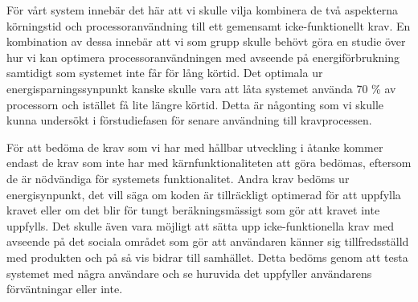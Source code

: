 För vårt system innebär det här att vi skulle vilja kombinera de två aspekterna körningstid och processoranvändning till ett gemensamt icke-funktionellt krav. En kombination av dessa innebär att vi som grupp skulle behövt göra en studie över hur vi kan optimera processoranvändningen med avseende på energiförbrukning samtidigt som systemet inte får för lång körtid. Det optimala ur energisparningssynpunkt kanske skulle vara att låta systemet använda 70 \% av processorn och istället få lite längre körtid. Detta är någonting som vi skulle kunna undersökt i förstudiefasen för senare användning till kravprocessen.

För att bedöma de krav som vi har med hållbar utveckling i åtanke kommer endast de krav som inte har med kärnfunktionaliteten att göra bedömas, eftersom de är nödvändiga för systemets funktionalitet. Andra krav bedöms ur energisynpunkt, det vill säga om koden är tillräckligt optimerad för att uppfylla kravet eller om det blir för tungt beräkningsmässigt som gör att kravet inte uppfylls. Det skulle även vara möjligt att sätta upp icke-funktionella krav med avseende på det sociala området som gör att användaren känner sig tillfredsställd med produkten och på så vis bidrar till samhället. Detta bedöms genom att testa systemet med några användare och se huruvida det uppfyller användarens förväntningar eller inte. 

